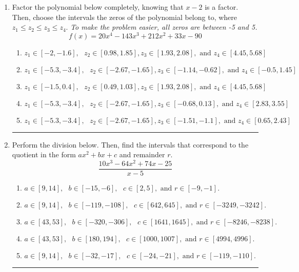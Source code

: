 \documentclass[14pt]{extbook}
\newcommand{\litem}[1]{\item#1\hspace*{-1cm}\rule{\textwidth}{0.4pt}}
\begin{document}
\begin{enumerate}
\litem{
Factor the polynomial below completely, knowing that $x -2$ is a factor. Then, choose the intervals the zeros of the polynomial belong to, where $z_1 \leq z_2 \leq z_3 \leq z_4$. \textit{To make the problem easier, all zeros are between -5 and 5.}\[ f(x) = 20x^{4} -143 x^{3} +212 x^{2} +33 x -90 \]\begin{enumerate}[label=\Alph*.]
\item \( z_1 \in [-2, -1.6], \text{   }  z_2 \in [0.98, 1.85], z_3 \in [1.93, 2.08], \text{   and   } z_4 \in [4.45, 5.68] \)
\item \( z_1 \in [-5.3, -3.4], \text{   }  z_2 \in [-2.67, -1.65], z_3 \in [-1.14, -0.62], \text{   and   } z_4 \in [-0.5, 1.45] \)
\item \( z_1 \in [-1.5, 0.4], \text{   }  z_2 \in [0.49, 1.03], z_3 \in [1.93, 2.08], \text{   and   } z_4 \in [4.45, 5.68] \)
\item \( z_1 \in [-5.3, -3.4], \text{   }  z_2 \in [-2.67, -1.65], z_3 \in [-0.68, 0.13], \text{   and   } z_4 \in [2.83, 3.55] \)
\item \( z_1 \in [-5.3, -3.4], \text{   }  z_2 \in [-2.67, -1.65], z_3 \in [-1.51, -1.1], \text{   and   } z_4 \in [0.65, 2.43] \)

\end{enumerate} }
\litem{
Perform the division below. Then, find the intervals that correspond to the quotient in the form $ax^2+bx+c$ and remainder $r$.\[ \frac{10x^{3} -64 x^{2} +74 x -25}{x -5} \]\begin{enumerate}[label=\Alph*.]
\item \( a \in [9, 14], \text{   } b \in [-15, -6], \text{   } c \in [2, 5], \text{   and   } r \in [-9, -1]. \)
\item \( a \in [9, 14], \text{   } b \in [-119, -108], \text{   } c \in [642, 645], \text{   and   } r \in [-3249, -3242]. \)
\item \( a \in [43, 53], \text{   } b \in [-320, -306], \text{   } c \in [1641, 1645], \text{   and   } r \in [-8246, -8238]. \)
\item \( a \in [43, 53], \text{   } b \in [180, 194], \text{   } c \in [1000, 1007], \text{   and   } r \in [4994, 4996]. \)
\item \( a \in [9, 14], \text{   } b \in [-32, -17], \text{   } c \in [-24, -21], \text{   and   } r \in [-119, -110]. \)


\end{enumerate}}
\end{enumerate}
\end{document}
